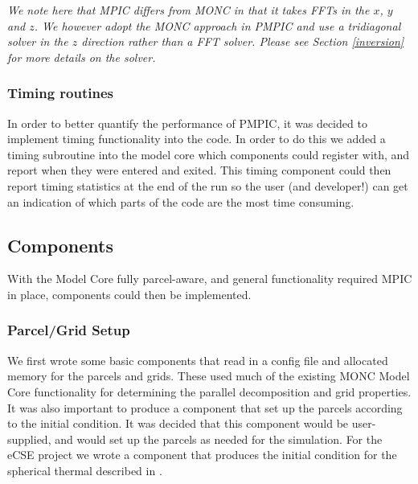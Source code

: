 \documentclass{article}
\begin{document}
\emph{We note here that MPIC differs from MONC in that it takes FFTs in the $x$, $y$ and $z$. We however adopt the MONC approach in PMPIC and use a tridiagonal solver in the $z$ direction rather than a FFT solver. Please see Section \ref{inversion} for more details on the solver.}

\subsubsection{Timing routines}
In order to better quantify the performance of PMPIC, it was decided to implement timing functionality into the code. In order to do this we added a timing subroutine into the model core which components could register with, and report when they were entered and exited. This timing component could then report timing statistics at the end of the run so the user (and developer!) can get an indication of which parts of the code are the most time consuming.

\subsection{Components}
With the Model Core fully parcel-aware, and general functionality required MPIC in place, components could then be implemented.

\subsubsection{Parcel/Grid Setup}
We first wrote some basic components that read in a config file and allocated memory for the parcels and grids. These used much of the existing MONC Model Core functionality for determining the parallel decomposition and grid properties. It was also important to produce a component that set up the parcels according to the initial condition. It was decided that this component would be user-supplied, and would set up the parcels as needed for the simulation. For the eCSE project we wrote a component that produces the initial condition for the spherical thermal described in \citet{Dritschel2018}.
\end{document}
